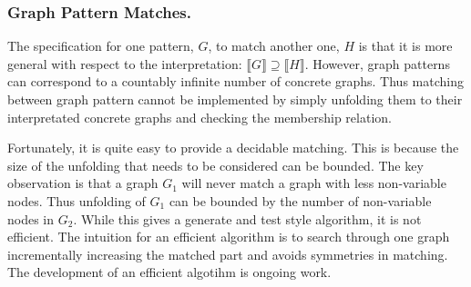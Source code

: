 \documentclass[runningheads]{llncs}
\newcommand{\binterp}[1]{\lceil\hspace{-0.27em}|\, #1\, |\hspace{-0.27em}\rceil}
\newcommand{\minterp}[1]{\llbracket #1 \rrbracket}
\begin{document}
\subsubsection{Graph Pattern Matches.}


The specification for one pattern, $G$, to match another one, $H$ is
that it is more general with respect to the interpretation:
$\minterp{G} \supseteq \minterp{H}$. However, graph patterns can
correspond to a countably infinite number of concrete graphs. Thus
matching between graph pattern cannot be implemented by simply
unfolding them to their interpretated concrete graphs and checking the
membership relation. 

Fortunately, it is quite easy to provide a decidable matching. This is
because the size of the unfolding that needs to be considered can be
bounded. The key observation is that a graph $G_1$ will never match a
graph with less non-variable nodes. Thus unfolding of $G_1$ can be
bounded by the number of non-variable nodes in $G_2$. While this gives
a generate and test style algorithm, it is not efficient. The
intuition for an efficient algorithm is to search through one graph
incrementally increasing the matched part and avoids symmetries in
matching. The development of an efficient algotihm is ongoing work.

%
%

%



\end{document}
